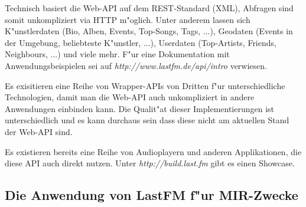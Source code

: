 Technisch basiert die Web-API auf dem REST-Standard (XML), Abfragen sind somit unkompliziert via HTTP m"oglich. Unter anderem lassen sich K"unstlerdaten (Bio, Alben, Events, Top-Songs, Tags, ...), Geodaten (Events in der Umgebung, beliebteste K"unstler, ...), Userdaten (Top-Artists, Friends, Neighbours, ...) und viele mehr. F"ur eine Dokumentation mit Anwendungsbeispielen sei auf \textit{http://www.lastfm.de/api/intro} verwiesen. 

Es exisitieren eine Reihe von Wrapper-APIs von Dritten f"ur unterschiedliche Technologien, damit man die Web-API auch unkompliziert in andere Anwendungen einbinden kann. Die Qualit"at dieser Implementierungen ist unterschiedlich und es kann durchaus sein dass diese nicht am aktuellen Stand der Web-API sind.

Es existieren bereits eine Reihe von Audioplayern und anderen Applikationen, die diese API auch direkt nutzen. Unter \textit{http://build.last.fm} gibt es einen Showcase.

\subsection{Die Anwendung von LastFM f"ur MIR-Zwecke}
